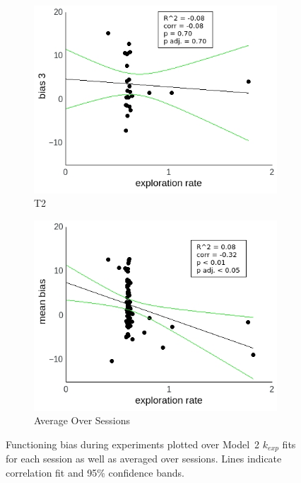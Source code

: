 \documentclass[a4paper]{scrreprt}
\begin{document}
\begin{figure}
\begin{subfigure}[b]{0.49\textwidth}
        \includegraphics[width=\textwidth]{figs/sec3/temp/temp_diff_3_mod2dat.jpeg}
        \caption{T2}
    \end{subfigure}
    \begin{subfigure}[b]{0.49\textwidth}
        \includegraphics[width=\textwidth]{figs/sec3/temp/temp_diff_mean_mod2dat.jpeg}
        \caption{Average Over Sessions}
    \end{subfigure}
\caption{Functioning bias during experiments plotted over Model~2 $k_{exp}$ fits for each session as well as averaged over sessions. Lines indicate correlation fit and 95\% confidence bands.}
\label{fig:temp_diff_mod2dat}
\end{figure}
\end{document}
